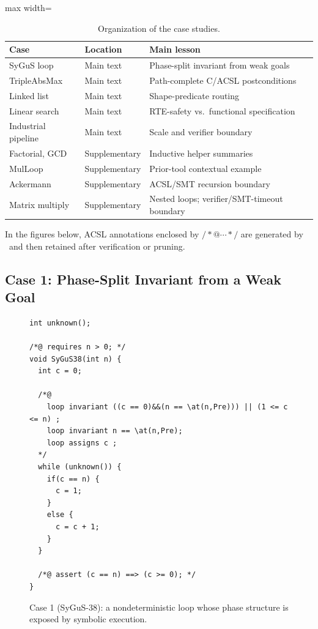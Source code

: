 \begin{table}[H]
  \centering
  \caption{Organization of the case studies.}
  \label{tab:case-study-map}
  \begin{adjustbox}{max width=\linewidth}
  \begin{tabular}{lll}
    \toprule
    \textbf{Case} & \textbf{Location} & \textbf{Main lesson} \\
    \midrule
    SyGuS loop & Main text & Phase-split invariant from weak goals \\
    TripleAbsMax & Main text & Path-complete C/ACSL postconditions \\
    Linked list & Main text & Shape-predicate routing \\
    Linear search & Main text & RTE-safety vs.\ functional specification \\
    Industrial pipeline & Main text & Scale and verifier boundary \\
    Factorial, GCD & Supplementary & Inductive helper summaries \\
    MulLoop & Supplementary & Prior-tool contextual example \\
    Ackermann & Supplementary & ACSL/SMT recursion boundary \\
    Matrix multiply & Supplementary & Nested loops; verifier/SMT-timeout boundary \\
    \bottomrule
  \end{tabular}%
  \end{adjustbox}
\end{table}

\DIFaddbegin
In the figures below, ACSL annotations enclosed by $/*@\cdots */$ are generated by \toolname\ and then retained after verification or pruning.
\DIFaddend



\subsection{Case 1: Phase-Split Invariant from a Weak Goal}

\begin{figure}[!t]
    \centering
    \begin{tcolorbox}[casebox, title={Case 1: symbolic state exposes loop phases}]
\begin{lstlisting}[style=caseinnerstyle]
int unknown();

/*@ requires n > 0; */
void SyGuS38(int n) {
  int c = 0;

  /*@
    loop invariant ((c == 0)&&(n == \at(n,Pre))) || (1 <= c <= n) ;
    loop invariant n == \at(n,Pre);
    loop assigns c ;
  */
  while (unknown()) {
    if(c == n) {
      c = 1;
    }
    else {
      c = c + 1;
    }
  }

  /*@ assert (c == n) ==> (c >= 0); */
}
\end{lstlisting}
    \end{tcolorbox}
    \caption{Case 1 (SyGuS-38): a nondeterministic loop whose phase structure is exposed by symbolic execution.}
    \label{fig:case1}
\end{figure}

